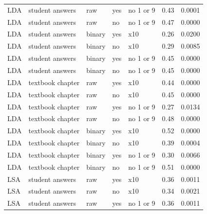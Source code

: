 \documentclass[a4paper,10pt,twoside]{article}
\begin{document}
\begin{table}[]
\begin{tabular}{lllllll}
		LDA        & student answers    & raw             & yes                 & no 1 or 9         & 0.43 & 0.0001       \\
		LDA        & student answers    & raw             & no                  & no 1 or 9         & 0.47 & 0.0000       \\
		LDA        & student answers    & binary          & yes                 & x10               & 0.26 & 0.0200       \\
		LDA        & student answers    & binary          & no                  & x10               & 0.29 & 0.0085       \\
		LDA        & student answers    & binary          & yes                 & no 1 or 9         & 0.45 & 0.0000       \\
		LDA        & student answers    & binary          & no                  & no 1 or 9         & 0.45 & 0.0000       \\
		LDA        & textbook chapter   & raw             & yes                 & x10               & 0.44 & 0.0000       \\
		LDA        & textbook chapter   & raw             & no                  & x10               & 0.45 & 0.0000       \\
		LDA        & textbook chapter   & raw             & yes                 & no 1 or 9         & 0.27 & 0.0134       \\
		LDA        & textbook chapter   & raw             & no                  & no 1 or 9         & 0.48 & 0.0000       \\
		LDA        & textbook chapter   & binary          & yes                 & x10               & 0.52 & 0.0000       \\
		LDA        & textbook chapter   & binary          & no                  & x10               & 0.39 & 0.0004       \\
		LDA        & textbook chapter   & binary          & yes                 & no 1 or 9         & 0.30 & 0.0066       \\
		LDA        & textbook chapter   & binary          & no                  & no 1 or 9         & 0.51 & 0.0000       \\
		LSA        & student answers    & raw             & yes                 & x10               & 0.36 & 0.0011       \\
		LSA        & student answers    & raw             & no                  & x10               & 0.34 & 0.0021       \\
		LSA        & student answers    & raw             & yes                 & no 1 or 9         & 0.36 & 0.0011       \\

\end{tabular}
\end{table}
\end{document}
